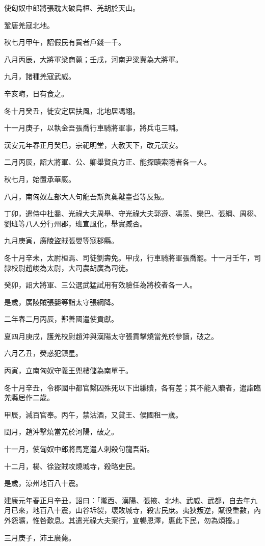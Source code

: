 \begin{pinyinscope}
使匈奴中郎將張耽大破烏桓、羌胡於天山。

鞏唐羌寇北地。

秋七月甲午，詔假民有貲者戶錢一千。

八月丙辰，大將軍梁商薨；壬戌，河南尹梁冀為大將軍。

九月，諸種羌寇武威。

辛亥晦，日有食之。

冬十月癸丑，徙安定居扶風，北地居馮翊。

十一月庚子，以執金吾張喬行車騎將軍事，將兵屯三輔。

漢安元年春正月癸巳，宗祀明堂，大赦天下，改元漢安。

二月丙辰，詔大將軍、公、卿舉賢良方正、能探賾索隱者各一人。

秋七月，始置承華廄。

八月，南匈奴左部大人句龍吾斯與薁鞬臺耆等反叛。

丁卯，遣侍中杜喬、光祿大夫周舉、守光祿大夫郭遵、馮羨、欒巴、張綱、周栩、劉班等八人分行州郡，班宣風化，舉實臧否。

九月庚寅，廣陵盜賊張嬰等寇郡縣。

冬十月辛未，太尉桓焉、司徒劉壽免。甲戌，行車騎將軍張喬罷。十一月壬午，司隸校尉趙峻為太尉，大司農胡廣為司徒。

癸卯，詔大將軍、三公選武猛試用有效驗任為將校者各一人。

是歲，廣陵賊張嬰等詣太守張綱降。

二年春二月丙辰，鄯善國遣使貢獻。

夏四月庚戌，護羌校尉趙沖與漢陽太守張貢擊燒當羌於參讀，破之。

六月乙丑，熒惑犯鎮星。

丙寅，立南匈奴守義王兜樓儲為南單于。

冬十月辛丑，令郡國中都官繫囚殊死以下出縑贖，各有差；其不能入贖者，遣詣臨羌縣居作二歲。

甲辰，減百官奉。丙午，禁沽酒，又貸王、侯國租一歲。

閏月，趙沖擊燒當羌於河陽，破之。

十一月，使匈奴中郎將馬寔遣人刺殺句龍吾斯。

十二月，楊、徐盜賊攻燒城寺，殺略吏民。

是歲，涼州地百八十震。

建康元年春正月辛丑，詔曰：「隴西、漢陽、張掖、北地、武威、武都，自去年九月已來，地百八十震，山谷坼裂，壞敗城寺，殺害民庶。夷狄叛逆，賦役重數，內外怨曠，惟咎歎息。其遣光祿大夫案行，宣暢恩澤，惠此下民，勿為煩擾。」

三月庚子，沛王廣薨。


\end{pinyinscope}
